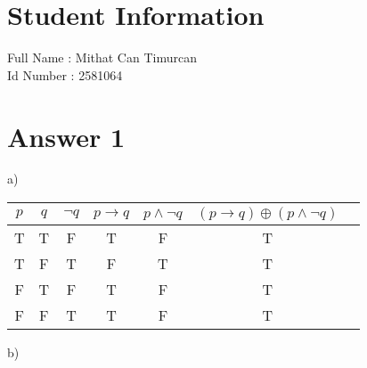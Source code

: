 \documentclass[12pt]{article}
\begin{document}
\section*{Student Information } 
Full Name : Mithat Can Timurcan \\
Id Number : 2581064 \\

\section*{Answer 1}
\hspace{5mm} a)\\
\begin{table}[H]
\small
\centering
\begin{tabular}{|c|c|c|c|c|c|c|}
\hline
$p$ & $q$ & $\neg q$ & $p\rightarrow q$ & $p \wedge \neg q$ & $ (p \rightarrow q) \oplus (p \wedge \neg q) $\\
\hline
T & T & F & T & F & T\\
T & F & T & F & T & T\\
F & T & F & T & F & T\\
F & F & T & T & F & T\\
\hline
\end{tabular}
\end{table}
b)\\
\end{document}
